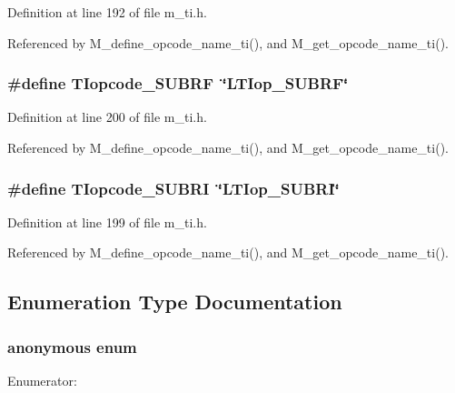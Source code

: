 Definition at line 192 of file m\_\-ti.h.

Referenced by M\_\-define\_\-opcode\_\-name\_\-ti(), and M\_\-get\_\-opcode\_\-name\_\-ti().
\subsubsection{\setlength{\rightskip}{0pt plus 5cm}\#define TIopcode\_\-SUBRF~\char`\"{}LTIop\_\-SUBRF\char`\"{}}\label{m__ti_8h_57b2c33083201dc358824e23fbf4591f}




Definition at line 200 of file m\_\-ti.h.

Referenced by M\_\-define\_\-opcode\_\-name\_\-ti(), and M\_\-get\_\-opcode\_\-name\_\-ti().
\subsubsection{\setlength{\rightskip}{0pt plus 5cm}\#define TIopcode\_\-SUBRI~\char`\"{}LTIop\_\-SUBRI\char`\"{}}\label{m__ti_8h_b38acba67e113dcc82538b91ba13e351}




Definition at line 199 of file m\_\-ti.h.

Referenced by M\_\-define\_\-opcode\_\-name\_\-ti(), and M\_\-get\_\-opcode\_\-name\_\-ti().

\subsection{Enumeration Type Documentation}
\subsubsection{\setlength{\rightskip}{0pt plus 5cm}anonymous enum}\label{m__ti_8h_6b7b47dd702d9e331586d485013fd1ea}


\begin{Desc}
\item[Enumerator: ]\par
\begin{description}
\item[{\em 
M\_\-TI\_\-1\label{m__ti_8h_6b7b47dd702d9e331586d485013fd1ea8c97b6e6d923b8a933a17773b509af4f}
}]\end{description}
\end{Desc}



